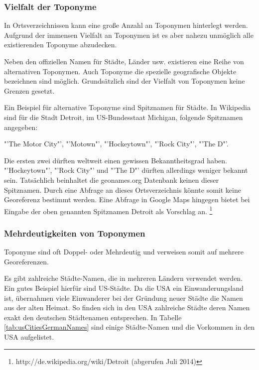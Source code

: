 			\subsubsection{Vielfalt der Toponyme}

				In Ortsverzeichnissen kann eine große Anzahl an Toponymen hinterlegt werden.
				Aufgrund der immensen Vielfalt an Toponymen ist es aber nahezu unmöglich alle existierenden Toponyme abzudecken. 

				Neben den offiziellen Namen für Städte, Länder usw. existieren eine Reihe von alternativen Toponymen.
				Auch Toponyme die spezielle geografische Objekte bezeichnen sind möglich.
				Grundsätzlich sind der Vielfalt von Toponymen keine Grenzen gesetzt.  

				Ein Beispiel für alternative Toponyme sind Spitznamen für Städte.
				In Wikipedia sind für die Stadt Detroit, im US-Bundesstaat Michigan, folgende Spitznamen angegeben: 

				 "'The Motor City"', "'Motown"', "'Hockeytown"', "'Rock City"', "'The D"'.

				Die ersten zwei dürften weltweit einen gewissen Bekanntheitsgrad haben. 
				"'Hockeytown"', "'Rock City"' und "'The D"' dürften allerdings weniger bekannt sein.
				Tatsächlich beinhaltet die geonames.org Datenbank keinen dieser Spitznamen.
				Durch eine Abfrage an dieses Ortsverzeichnis könnte somit keine Georeferenz bestimmt werden.
				Eine Abfrage in Google Maps hingegen bietet bei Eingabe der oben genannten Spitznamen Detroit als Vorschlag an. \footnote{http://de.wikipedia.org/wiki/Detroit (abgerufen Juli 2014)} 

			\subsubsection{Mehrdeutigkeiten von Toponymen} 

				Toponyme sind oft Doppel- oder Mehrdeutig und verweisen somit auf mehrere Georeferenzen.
				
				Es gibt zahlreiche Städte-Namen, die in mehreren Ländern verwendet werden.
				Ein gutes Beispiel hierfür sind US-Städte. 
				Da die USA ein Einwanderungsland ist, übernahmen viele Einwanderer bei der Gründung neuer Städte die Namen aus der alten Heimat. 
				So finden sich in den USA zahlreiche Städte deren Namen exakt den deutschen Städtenamen entsprechen. 
				In Tabelle \ref{tab:usCitiesGermanNames} sind einige Städte-Namen und die Vorkommen in den USA aufgelistet.
				
